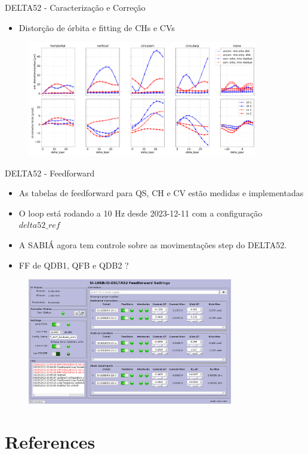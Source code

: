 \documentclass{beamer}					  %
\begin{document}
\begin{frame}{DELTA52 - Caracterização e Correção}
    \begin{itemize}
    		\item Distorção de órbita e fitting de CHs e CVs
    \end{itemize}
    \begin{figure}[H]
        	\centering
            \includegraphics[width=0.9\textwidth]{2024-01-26/figures/orbcorr_ff.pdf}
            \label{fig:bba}
    \end{figure} 
\end{frame}

\begin{frame}{DELTA52 - Feedforward}
    \scriptsize{\begin{itemize}
    		\item As tabelas de feedforward para QS, CH e CV estão medidas e implementadas
            \item O loop está rodando a 10 Hz desde 2023-12-11 com a configuração $delta52\_ref$
            \item A SABIÁ agora tem controle sobre as movimentações step do DELTA52.
            \item FF de QDB1, QFB e QDB2 ?
    \end{itemize}}
    \begin{figure}[H]
        	\centering
            \includegraphics[width=0.8\textwidth]{2024-01-26/figures/idff.png}
            \label{fig:bba}
    \end{figure} 
\end{frame}





\section{References}
\end{document}
